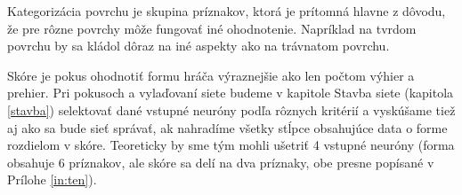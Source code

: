 Kategorizácia povrchu je skupina príznakov, ktorá je prítomná hlavne z dôvodu, že pre rôzne povrchy môže fungovať iné ohodnotenie. Napríklad na tvrdom povrchu by sa kládol dôraz na iné aspekty ako na trávnatom povrchu.

Skóre je pokus ohodnotiť formu hráča výraznejšie ako len počtom výhier a prehier. Pri pokusoch a vylaďovaní siete budeme v kapitole Stavba siete (kapitola \ref{stavba}) selektovať dané vstupné neuróny podľa rôznych kritérií a vyskúšame tiež aj ako sa bude sieť správať, ak nahradíme všetky stĺpce obsahujúce data o forme rozdielom v skóre.
Teoreticky by sme tým mohli ušetriť 4 vstupné neuróny (forma obsahuje 6 príznakov, ale skóre sa delí na dva príznaky, obe presne popísané v Prílohe \ref{in:ten}).